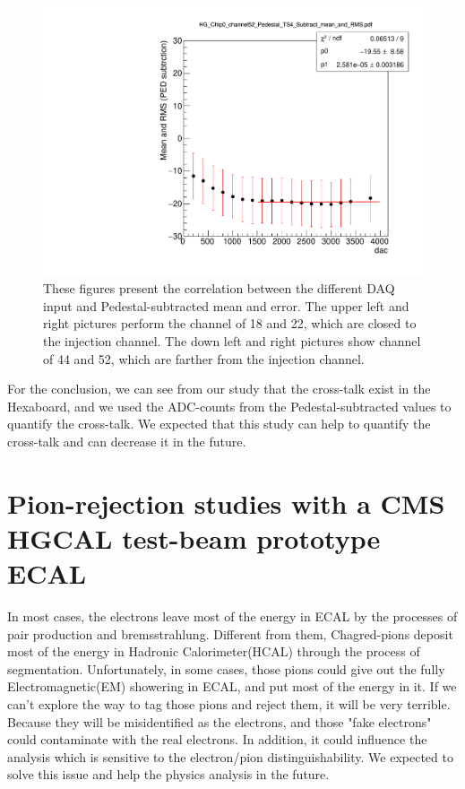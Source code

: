 \begin{figure}[!htb]
     \includegraphics[width=\cmsFigWidth]{PCB_study/HG_Chip0_channel52_Pedestal_TS4_Subtract_mean_and_RMS.pdf}
\caption{These figures present the correlation between the different DAQ input and Pedestal-subtracted mean and error. The upper left and right pictures perform the channel of 18 and 22, which are closed to the injection channel. The down left and right pictures show channel of 44 and 52, which are farther from the injection channel.}
\label{fig:PCB_injection_pulse_study}
\end{figure}

For the conclusion, we can see from our study that the cross-talk exist in the Hexaboard, and we used the ADC-counts from the Pedestal-subtracted values to quantify the cross-talk. We expected that this study can help to quantify the cross-talk and can decrease it in the future.

\section{Pion-rejection studies with a CMS HGCAL test-beam prototype ECAL}
In most cases, the electrons leave most of the energy in ECAL by the processes of pair production and bremsstrahlung. Different from them, Chagred-pions deposit most of the energy in Hadronic Calorimeter(HCAL) through the process of segmentation. Unfortunately, in some cases, those pions could give out the fully Electromagnetic(EM) showering in ECAL, and put most of the energy in it. If we can't explore the way to tag those pions and reject them, it will be very terrible. Because they will be misidentified as the electrons, and those "fake electrons" could contaminate with the real electrons.  In addition, it could influence the analysis which is sensitive to the electron/pion distinguishability. We expected to solve this issue and help the physics analysis in the future.

